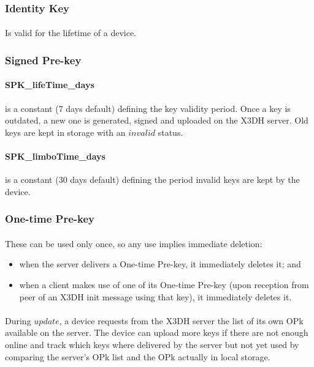 \documentclass[a4paper,11pt]{article}
\begin{document}
    \subsubsection{Identity Key}
      \paragraph{}Is valid for the lifetime of a device.
    
    \subsubsection{Signed Pre-key}
      \paragraph*{SPK\_lifeTime\_days}is a constant (7 days default) defining the key validity period. Once a key is outdated, a new one is generated, signed and uploaded on the X3DH server. Old keys are kept in storage with an $invalid$ status.
      \paragraph*{SPK\_limboTime\_days}is a constant (30 days default) defining the period invalid keys are kept by the device.
       
    \subsubsection{One-time Pre-key}
      \paragraph{}These can be used only once, so any use implies immediate deletion:
      \begin{itemize}
      \item when the server delivers a One-time Pre-key, it immediately deletes it; and
      \item when a client makes use of one of its One-time Pre-key (upon reception from peer of an X3DH init message using that key), it immediately deletes it.
      \end{itemize}
      \paragraph*{}During $update$, a device requests from the X3DH server the list of its own OPk available on the server. The device can upload more keys if there are not enough online and track which keys where delivered by the server but not yet used by comparing the server's OPk list and the OPk actually in local storage.
\end{document}
